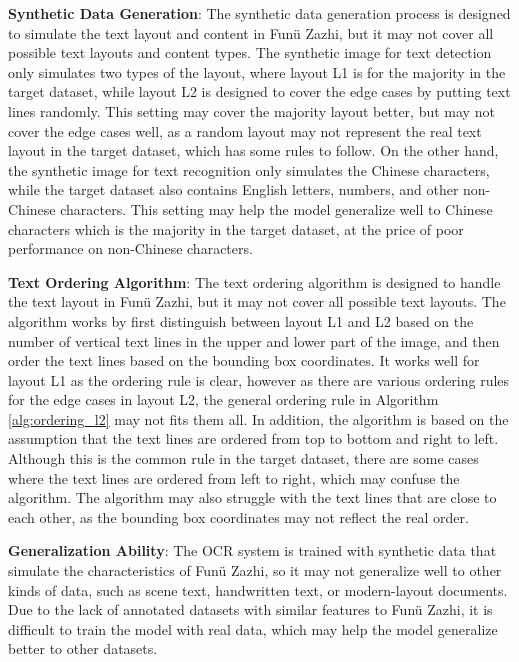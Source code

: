 \documentclass[12pt,twoside]{report}
\begin{document}
\textbf{Synthetic Data Generation}: The synthetic data generation process is designed to simulate the text layout and content in Funü Zazhi, but it may not cover all possible text layouts and content types. The synthetic image for text detection only simulates two types of the layout, where layout L1 is for the majority in the target dataset, while layout L2 is designed to cover the edge cases by putting text lines randomly. This setting may cover the majority layout better, but may not cover the edge cases well, as a random layout may not represent the real text layout in the target dataset, which has some rules to follow. On the other hand, the synthetic image for text recognition only simulates the Chinese characters, while the target dataset also contains English letters, numbers, and other non-Chinese characters. This setting may help the model generalize well to Chinese characters which is the majority in the target dataset, at the price of poor performance on non-Chinese characters.

\textbf{Text Ordering Algorithm}: The text ordering algorithm is designed to handle the text layout in Funü Zazhi, but it may not cover all possible text layouts. The algorithm works by first distinguish between layout L1 and L2 based on the number of vertical text lines in the upper and lower part of the image, and then order the text lines based on the bounding box coordinates. It works well for layout L1 as the ordering rule is clear, however as there are various ordering rules for the edge cases in layout L2, the general ordering rule in Algorithm \ref{alg:ordering_l2} may not fits them all. In addition, the algorithm is based on the assumption that the text lines are ordered from top to bottom and right to left. Although this is the common rule in the target dataset, there are some cases where the text lines are ordered from left to right, which may confuse the algorithm. The algorithm may also struggle with the text lines that are close to each other, as the bounding box coordinates may not reflect the real order.

\textbf{Generalization Ability}: The OCR system is trained with synthetic data that simulate the characteristics of Funü Zazhi, so it may not generalize well to other kinds of data, such as scene text, handwritten text, or modern-layout documents. Due to the lack of annotated datasets with similar features to Funü Zazhi, it is difficult to train the model with real data, which may help the model generalize better to other datasets. 
\end{document}
